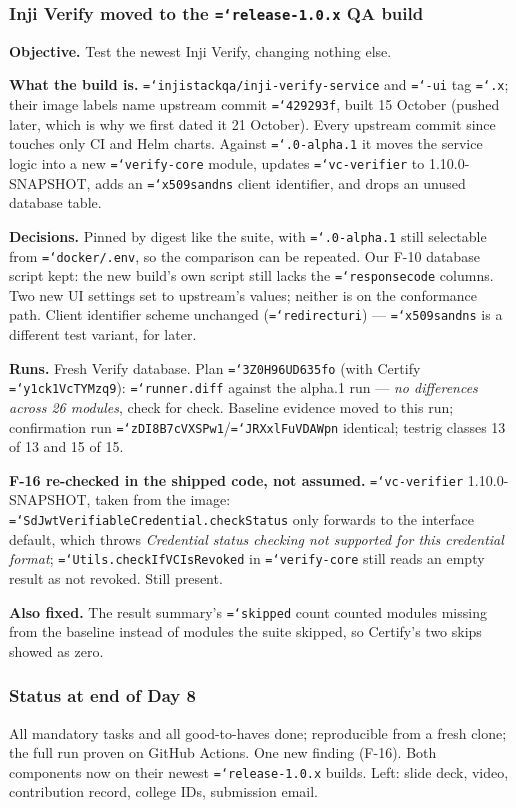 \documentclass[11pt,a4paper]{article}
\let\origtexttt\texttt
\renewcommand{\texttt}[1]{\origtexttt{\hyphenchar\font=`\-\relax #1}}
\renewcommand{\_}{\textunderscore\allowbreak}
\begin{document}
\subsubsection*{Inji Verify moved to the \texttt{release-1.0.x} QA build}
\textbf{Objective.} Test the newest Inji Verify, changing nothing else.

\textbf{What the build is.} \texttt{injistackqa/inji-verify-service} and \texttt{-ui} tag
\texttt{1.0.x}; their image labels name upstream commit \texttt{429293f}, built 15 October (pushed
later, which is why we first dated it 21 October). Every upstream commit since touches only CI and
Helm charts. Against \texttt{1.0.0-alpha.1} it moves the service logic into a new
\texttt{verify-core} module, updates \texttt{vc-verifier} to 1.10.0-SNAPSHOT, adds an
\texttt{x509\_san\_dns} client identifier, and drops an unused database table.

\textbf{Decisions.} Pinned by digest like the suite, with \texttt{1.0.0-alpha.1} still selectable
from \texttt{docker/.env}, so the comparison can be repeated. Our F-10 database script kept: the
new build's own script still lacks the \texttt{response\_code} columns. Two new UI settings set to
upstream's values; neither is on the conformance path. Client identifier scheme unchanged
(\texttt{redirect\_uri}) --- \texttt{x509\_san\_dns} is a different test variant, for later.

\textbf{Runs.} Fresh Verify database. Plan \texttt{3Z0H96UD635fo} (with Certify
\texttt{y1ck1VcTYMzq9}): \texttt{runner.diff} against the alpha.1 run --- \emph{no differences
across 26 modules}, check for check. Baseline evidence moved to this run; confirmation run
\texttt{zDI8B7cVXSPw1}/\texttt{JRXxlFuVDAWpn} identical; testrig classes 13 of 13 and 15 of 15.

\textbf{F-16 re-checked in the shipped code, not assumed.} \texttt{vc-verifier} 1.10.0-SNAPSHOT,
taken from the image: \texttt{SdJwtVerifiableCredential.checkStatus} only forwards to the
interface default, which throws \emph{Credential status checking not supported for this
credential format}; \texttt{Utils.checkIfVCIsRevoked} in \texttt{verify-core} still reads an empty
result as not revoked. Still present.

\textbf{Also fixed.} The result summary's \texttt{skipped} count counted modules missing from the
baseline instead of modules the suite skipped, so Certify's two skips showed as zero.

\subsubsection*{Status at end of Day 8}
All mandatory tasks and all good-to-haves done; reproducible from a fresh clone; the full run
proven on GitHub Actions. One new finding (F-16). Both components now on their newest
\texttt{release-1.0.x} builds. Left: slide deck,
video, contribution record, college IDs, submission email.
\end{document}
